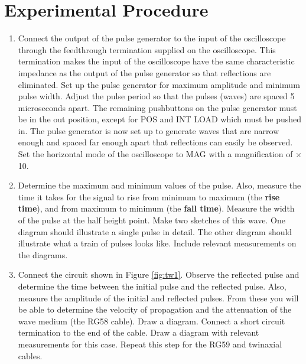 \section{Experimental Procedure}
\begin{enumerate}

\item Connect the output of the pulse generator to the input of the oscilloscope through the feedthrough termination supplied on the oscilloscope. This termination makes the input of the oscilloscope have the same characteristic impedance as the output of the pulse generator so that reflections are eliminated. Set up the pulse generator for maximum amplitude and minimum pulse width. Adjust the pulse period so that the pulses (waves) are spaced 5 microseconds apart. The remaining pushbuttons on the pulse generator must be in the out position, except for POS and INT LOAD which must be pushed in. The pulse generator is now set up to generate waves that are narrow enough and spaced far enough apart that reflections can easily be observed. Set the horizontal mode of the oscilloscope to MAG with a magnification of $\times$10. 

\item Determine the maximum and minimum values of the pulse. Also, measure the time it takes for the signal to rise from minimum to maximum (the {\bf rise time}), and from maximum to minimum (the {\bf fall time}). Measure the width of the pulse at the half height point. Make two sketches of this wave. One diagram should illustrate a single pulse in detail. The other diagram should illustrate what a train of pulses looks like. Include relevant measurements on the diagrams. 

\item  Connect the circuit shown in Figure \ref{fig:tw1}. Observe the reflected pulse and determine the time between the initial pulse and the reflected pulse. Also, measure the amplitude of the initial and reflected pulses. From these you will be able to determine the velocity of propagation and the attenuation of the wave medium (the RG58 cable). Draw a diagram. Connect a short circuit termination to the end of the cable. Draw a diagram with relevant measurements for this case. Repeat this step for the RG59 and twinaxial cables.


\end{enumerate}
